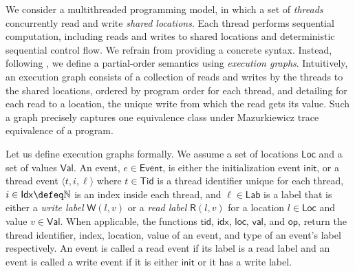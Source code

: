 \documentclass[acmsmall]{acmart}
\def\tuple#1{{\langle #1\rangle}}
\def\nats{\mathbb{N}}
\newcommand{\opw}{\mathsf{W}}
\newcommand{\opr}{\mathsf{R}}
\newcommand{\op}{\mathsf{op}}
\newcommand{\Val}{\mathsf{Val}}
\newcommand{\Idx}{\mathsf{Idx}}
\newcommand{\Loc}{\mathsf{Loc}}
\newcommand{\Lab}{\mathsf{Lab}}
\newcommand{\Tid}{\mathsf{Tid}}
\newcommand{\Event}{\mathsf{Event}}
\newcommand{\val}{\mathsf{val}}
\newcommand{\idx}{\mathsf{idx}}
\newcommand{\loc}{\mathsf{loc}}
\newcommand{\tid}{\mathsf{tid}}
\newcommand{\init}{\mathsf{init}}
\begin{document}
We consider a multithreaded programming model, in which a set of \emph{threads} concurrently read and write \emph{shared locations}.
Each thread performs sequential computation, including reads and writes to shared locations and deterministic sequential control flow.
We refrain from providing a concrete syntax.
Instead, following \cite{trust}, we define a partial-order semantics using \emph{execution graphs}.
Intuitively, an execution graph consists of a collection of reads and writes by the threads to the shared locations,
ordered by program order for each thread, and
detailing for each read to a location, the unique write from which the read gets its value. 
Such a graph precisely captures one equivalence class under Mazurkiewicz trace equivalence of a program. 

Let us define execution graphs formally.
We assume a set of locations $\Loc$ and a set of values $\Val$.
An event, \( e \in  \Event\), is either the initialization event $\init$, or a thread event
\(\tuple{t, i, \ell}\) where $t \in \Tid$ is a thread identifier unique for each thread, 
$i \in \Idx \defeq \nats$ is an index inside each thread, and
$\ell \in \Lab$ is a label that is either a \emph{write label}
$\opw(l, v)$ or a \emph{read label} $\opr(l, v)$ for a location $l\in\Loc$ and value $v\in \Val$.
%
When applicable, the functions $\tid$, $\idx$, $\loc$, $\val$, and $\op$, return the thread identifier, index,
location, value of an event, and type of an event's label respectively. 
An event is called a read event if its label is a read label and an event is called
a write event if it is either $\init$ or it has a write label.
\end{document}
